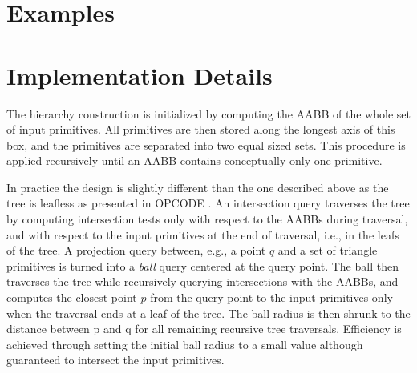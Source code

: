 \section{Examples}
\label{AABB_tree_section_examples}

\section{Implementation Details}
\label{AABB_tree_section_intro}

The hierarchy construction is initialized by computing the AABB of the whole set of input primitives. All primitives are then stored along the longest axis of this box, and the primitives are separated into two equal sized sets. This procedure is applied recursively until an AABB contains conceptually only one primitive. 

In practice the design is slightly different than the one described above as the tree is leafless as presented in OPCODE \cite{opcode}. An intersection query traverses the tree by computing intersection tests only with respect to the AABBs during traversal, and with respect to the input primitives at the end of traversal, i.e., in the leafs of the tree. A projection query between, e.g., a point $q$ and a set of triangle primitives is turned into a \emph{ball} query centered at the query point. The ball then traverses the tree while recursively querying intersections with the AABBs, and computes the closest point $p$ from the query point to the input primitives only when the traversal ends at a leaf of the tree. The ball radius is then shrunk to the distance between p and q for all remaining recursive tree traversals. Efficiency is achieved through setting the initial ball radius to a small value although guaranteed to intersect the input primitives.